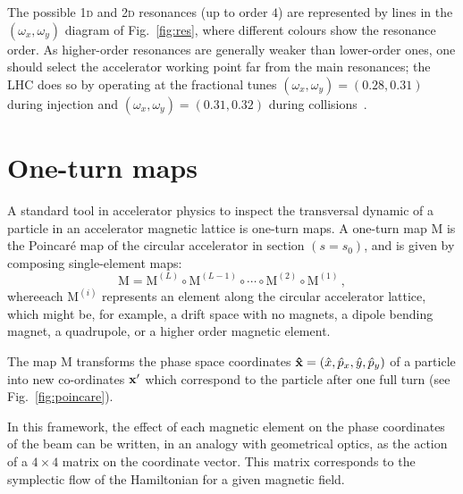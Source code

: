 The possible 1\textsc{d} and 2\textsc{d} resonances (up to order $4$) are represented by lines in the $(\omega_x, \omega_y)$ diagram of Fig.~\ref{fig:res}, where different colours show the resonance order. As higher-order resonances are generally weaker than lower-order ones, one should select the accelerator working point far from the main resonances; the LHC does so by operating at the fractional tunes $(\omega_x, \omega_y)=(0.28, 0.31)$ during injection and $(\omega_x, \omega_y)=(0.31, 0.32)$ during collisions~\cite{Benedikt:823808}.

\section{One-turn maps}

A standard tool in accelerator physics to inspect the transversal dynamic of a particle in an accelerator magnetic lattice is one-turn maps. A one-turn map \(\mathrm{M}\) is the Poincaré map of the circular accelerator in section $(s = s_0)$, and is given by composing single-element maps:
\begin{equation}
	\mathrm{M} = \mathrm{M}^{(L)} \circ \mathrm{M}^{(L - 1)} \circ \cdots \circ \mathrm{M}^{(2)} \circ \mathrm{M}^{(1)} \,,
\end{equation}
whereeach $\mathrm{M}^{(i)}$ represents an element along the circular accelerator lattice, which might be, for example, a drift space with no magnets, a dipole bending magnet, a quadrupole, or a higher order magnetic element. 

The map \(\mathrm{M}\) transforms the phase space coordinates \(\vb{\hat x} = (\hat x, \hat p_x, \hat y, \hat p_y)\) of a particle into new co-ordinates \(\vb{x}'\) which correspond to the particle after one full turn (see Fig.~\ref{fig:poincare}).

In this framework, the effect of each magnetic element on the phase coordinates of the beam can be written, in an analogy with geometrical optics, as the action of a $4\times4$ matrix on the coordinate vector. This matrix corresponds to the symplectic flow of the Hamiltonian for a given magnetic field.

